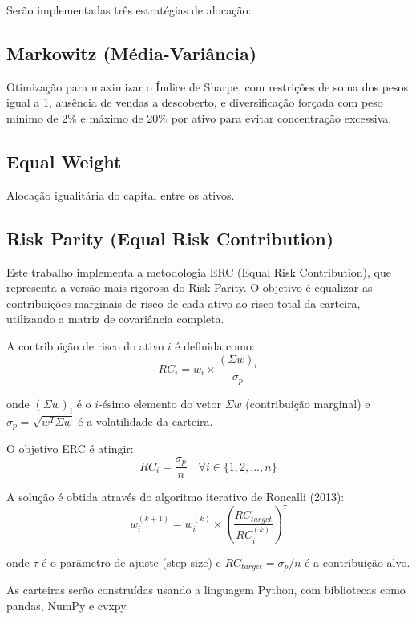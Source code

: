 Serão implementadas três estratégias de alocação:

\subsection{Markowitz (Média-Variância)}
Otimização para maximizar o Índice de Sharpe, com restrições de soma dos pesos igual a 1, ausência de vendas a descoberto, e diversificação forçada com peso mínimo de 2\% e máximo de 20\% por ativo para evitar concentração excessiva.

\subsection{Equal Weight}
Alocação igualitária do capital entre os ativos.

\subsection{Risk Parity (Equal Risk Contribution)}
Este trabalho implementa a metodologia ERC (Equal Risk Contribution), que representa a versão mais rigorosa do Risk Parity. O objetivo é equalizar as contribuições marginais de risco de cada ativo ao risco total da carteira, utilizando a matriz de covariância completa.

A contribuição de risco do ativo $i$ é definida como:
\begin{equation}
RC_i = w_i \times \frac{(\Sigma w)_i}{\sigma_p}
\label{eq:risk_contribution}
\end{equation}

onde $(\Sigma w)_i$ é o $i$-ésimo elemento do vetor $\Sigma w$ (contribuição marginal) e $\sigma_p = \sqrt{w^T \Sigma w}$ é a volatilidade da carteira.

O objetivo ERC é atingir:
\begin{equation}
RC_i = \frac{\sigma_p}{n} \quad \forall i \in \{1, 2, ..., n\}
\label{eq:erc_target}
\end{equation}

A solução é obtida através do algoritmo iterativo de Roncalli (2013):
\begin{equation}
w_i^{(k+1)} = w_i^{(k)} \times \left(\frac{RC_{target}}{RC_i^{(k)}}\right)^{\tau}
\label{eq:erc_algorithm}
\end{equation}

onde $\tau$ é o parâmetro de ajuste (step size) e $RC_{target} = \sigma_p/n$ é a contribuição alvo.

As carteiras serão construídas usando a linguagem Python, com bibliotecas como pandas, NumPy e cvxpy.

